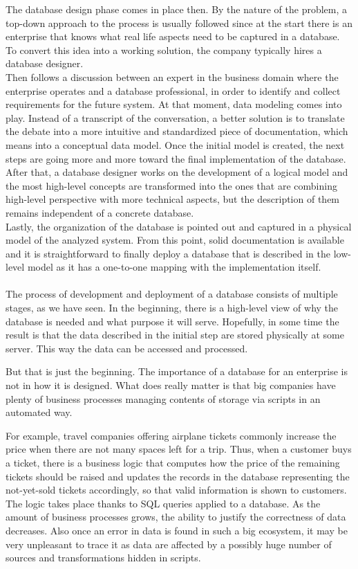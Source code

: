 The database design phase comes in place then. By the nature of the problem, a top-down approach to the process is usually followed since at the start there is an enterprise that knows what real life aspects need to be captured in a database. To convert this idea into a working solution, the company typically hires a database designer. \\

Then follows a discussion between an expert in the business domain where the enterprise operates and a database professional, in order to identify and collect requirements for the future system.
At that moment, data modeling comes into play. 
Instead of a transcript of the conversation, a better solution is to translate the debate into a more intuitive and standardized piece of documentation, which means into a conceptual data model.
Once the initial model is created, the next steps are going more and more toward the final implementation of the database. After that, a database designer works on the development of a logical model and the most high-level concepts are transformed into the ones that are combining high-level perspective with more technical aspects, but the description of them remains independent of a concrete database. \\

Lastly, the organization of the database is pointed out and captured in a physical model of the analyzed system. From this point, solid documentation is available and it is straightforward to finally deploy a database that is described in the low-level model as it has a one-to-one mapping with the implementation itself. \\ \\

The process of development and deployment of a database consists of multiple stages, as we have seen. In the beginning, there is a high-level view of why the database is needed and what purpose it will serve. Hopefully, in some time the result is that the data described in the initial step are stored physically at some server. 
This way the data can be accessed and processed.

But that is just the beginning. The importance of a database for an enterprise is not in how it is designed. What does really matter is that big companies have plenty of business processes managing contents of storage via scripts in an automated way. 

For example, travel companies offering airplane tickets commonly increase the price when there are not many spaces left for a trip. 
Thus, when a customer buys a ticket, there is a business logic that computes how the price of the remaining tickets should be raised and updates the records in the database representing the not-yet-sold tickets accordingly, so that valid information is shown to customers.
The logic takes place thanks to SQL queries applied to a database.
As the amount of business processes grows, the ability to justify the correctness of data decreases. 
Also once an error in data is found in such a big ecosystem, it may be very unpleasant to trace it as data are affected by a possibly huge number of sources and transformations hidden in scripts.


